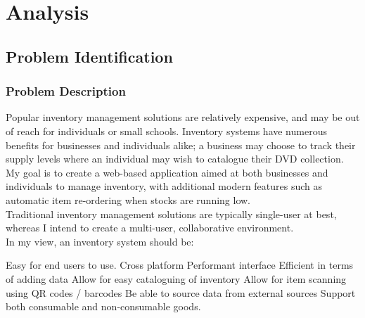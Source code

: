 \documentclass{article}
\title{\projectname}
\author{James Cahill}
\date{Sepetember 2023}
\begin{document}
\tableofcontents

\pagebreak

\section{Analysis}

\subsection{Problem Identification}

\subsubsection{Problem Description}

Popular inventory management solutions are relatively expensive, and may be out
of reach for individuals or small schools.
Inventory systems have numerous benefits for businesses and individuals alike; a business
may choose to track their supply levels where an individual may wish to catalogue their DVD collection. \\

\noindent My goal is to create a web-based application aimed at both businesses and individuals to manage
inventory, with additional modern features such as automatic item re-ordering when stocks are running low.\\

\noindent Traditional inventory management solutions are typically single-user at best, whereas I intend to create
a multi-user, collaborative environment.\\

\noindent In my view, an inventory system should be:

\begin{outline}
    \1 Easy for end users to use.
    \1 Cross platform
    \1 Performant interface
    \1 Efficient in terms of adding data
    \1 Allow for easy cataloguing of inventory
    \1 Allow for item scanning using QR codes / barcodes
    \1 Be able to source data from external sources
    \1 Support both consumable and non-consumable goods.

    
\end{outline}
\end{document}
